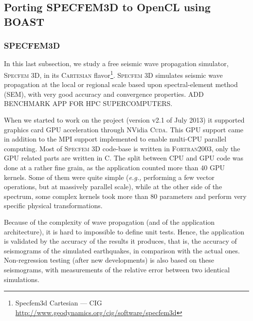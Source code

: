 \newcommand{\productname}[1]{\textsc{#1}}
\newcommand{\latin}[1]{\textit{#1}}

\newcommand{\Specfem}{\productname{Specfem 3D}\xspace}
\newcommand{\Cuda}{\productname{Cuda}\xspace}
\newcommand{\eg}{\latin{e.g.,}\xspace}
\newcommand{\OCL}{\productname{OpenCL}\xspace}
\newcommand{\code}[1]{\texttt{#1}}

\newcommand{\etc}[1]{\latin{etc}}


\subsection{Porting SPECFEM3D to OpenCL using BOAST}
\label{subsec:specfem}

\subsubsection{SPECFEM3D}

In this last subsection, we study a free seismic wave propagation
simulator, \Specfem, in its \productname{Cartesian}
flavor\footnote{Specfem3d Cartesian --- CIG
  \url{http://www.geodynamics.org/cig/software/specfem3d}}. \Specfem
simulates seismic wave propagation at the local or regional scale
based upon spectral-element method (SEM), with very good accuracy and
convergence properties. ADD BENCHMARK APP FOR HPC SUPERCOMPUTERS.

When we started to work on the project (version v2.1 of July 2013) it
supported graphics card GPU acceleration through NVidia \Cuda. This
GPU support came in addition to the MPI support implemented to enable
multi-CPU parallel computing. Most of \Specfem code-base is written in
\productname{Fortran2003}, only the GPU related parts are written in
C.  The split between CPU and GPU code was done at a rather fine
grain, as the application counted more than 40 GPU kernels. Some of
them were quite simple (\eg performing a few vector operations, but at
massively parallel scale), while at the other side of the spectrum,
some complex kernels took more than 80 parameters and perform very
specific physical transformations.

Because of the complexity of wave propagation (and of the application
architecture), it is hard to impossible to define unit tests. Hence,
the application is validated by the accuracy of the results it
produces, that is, the accuracy of seismograms of the simulated
earthquakes, in comparison with the actual ones. Non-regression
testing (after new developments) is also based on these seismograms,
with measurements of the relative error between two identical
simulations.

